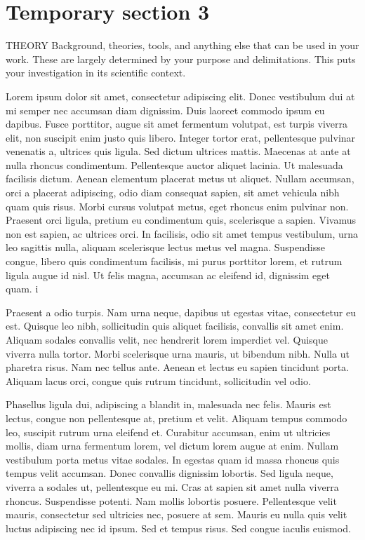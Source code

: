 \section{Temporary section 3}
THEORY Background, theories, tools, and anything else that can be used in your work.
These are largely determined by your purpose and delimitations. This puts your investigation
in its scientific context.

Lorem ipsum dolor sit amet, consectetur adipiscing elit. Donec vestibulum dui at mi semper nec accumsan diam dignissim. Duis laoreet commodo ipsum eu dapibus. Fusce porttitor, augue sit amet fermentum volutpat, est turpis viverra elit, non suscipit enim justo quis libero. Integer tortor erat, pellentesque pulvinar venenatis a, ultrices quis ligula. Sed dictum ultrices mattis. Maecenas at ante at nulla rhoncus condimentum. Pellentesque auctor aliquet lacinia. Ut malesuada facilisis dictum. Aenean elementum placerat metus ut aliquet. Nullam accumsan, orci a placerat adipiscing, odio diam consequat sapien, sit amet vehicula nibh quam quis risus. Morbi cursus volutpat metus, eget rhoncus enim pulvinar non. Praesent orci ligula, pretium eu condimentum quis, scelerisque a sapien. Vivamus non est sapien, ac ultrices orci. In facilisis, odio sit amet tempus vestibulum, urna leo sagittis nulla, aliquam scelerisque lectus metus vel magna. Suspendisse congue, libero quis condimentum facilisis, mi purus porttitor lorem, et rutrum ligula augue id nisl. Ut felis magna, accumsan ac eleifend id, dignissim eget quam.
i

Praesent a odio turpis. Nam urna neque, dapibus ut egestas vitae, consectetur eu est. Quisque leo nibh, sollicitudin quis aliquet facilisis, convallis sit amet enim. Aliquam sodales convallis velit, nec hendrerit lorem imperdiet vel. Quisque viverra nulla tortor. Morbi scelerisque urna mauris, ut bibendum nibh. Nulla ut pharetra risus. Nam nec tellus ante. Aenean et lectus eu sapien tincidunt porta. Aliquam lacus orci, congue quis rutrum tincidunt, sollicitudin vel odio.

Phasellus ligula dui, adipiscing a blandit in, malesuada nec felis. Mauris est lectus, congue non pellentesque at, pretium et velit. Aliquam tempus commodo leo, suscipit rutrum urna eleifend et. Curabitur accumsan, enim ut ultricies mollis, diam urna fermentum lorem, vel dictum lorem augue at enim. Nullam vestibulum porta metus vitae sodales. In egestas quam id massa rhoncus quis tempus velit accumsan. Donec convallis dignissim lobortis. Sed ligula neque, viverra a sodales ut, pellentesque eu mi. Cras at sapien sit amet nulla viverra rhoncus. Suspendisse potenti. Nam mollis lobortis posuere. Pellentesque velit mauris, consectetur sed ultricies nec, posuere at sem. Mauris eu nulla quis velit luctus adipiscing nec id ipsum. Sed et tempus risus. Sed congue iaculis euismod.

